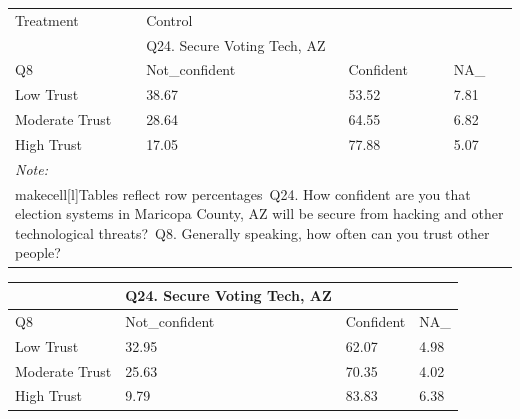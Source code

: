 \documentclass[
  11pt,
  a4paper,
]{article}
\begin{document}
\begin{table}
\centering
\centering
\begin{tabular}[t]{l|l|l|l}
\hline
\multicolumn{1}{l|}{Treatment} & \multicolumn{1}{l}{Control} \\
\cline{1-1} \cline{2-2}
 & Q24. Secure Voting Tech, AZ &  & \\
\hline
Q8 & Not\_confident & Confident & NA\_\\
\hline
Low Trust & 38.67 & 53.52 & 7.81\\
\hline
Moderate Trust & 28.64 & 64.55 & 6.82\\
\hline
High Trust & 17.05 & 77.88 & 5.07\\
\hline
\multicolumn{4}{l}{\rule{0pt}{1em}\textit{Note: }}\\
\multicolumn{4}{l}{\rule{0pt}{1em}makecell[l]{Tables reflect row percentages\ Q24. How confident are you that election systems in Maricopa County, AZ will be secure from hacking and other technological threats?\ Q8. Generally speaking, how often can you trust other people?}}\\
\end{tabular}
\centering
\begin{tabular}[t]{l|l|l|l}
\hline
 & Q24. Secure Voting Tech, AZ &  & \\
\hline
Q8 & Not\_confident & Confident & NA\_\\
\hline
Low Trust & 32.95 & 62.07 & 4.98\\
\hline
Moderate Trust & 25.63 & 70.35 & 4.02\\
\hline
High Trust & 9.79 & 83.83 & 6.38\\
\hline
\end{tabular}
\end{table}
\end{document}
